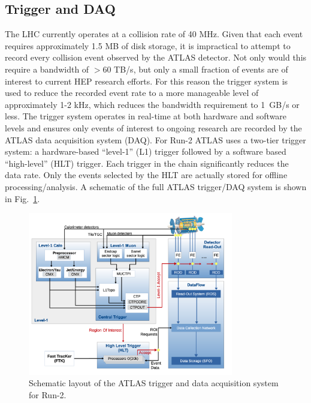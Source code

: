 \subsection{Trigger and DAQ}
The LHC currently operates at a collision rate of 40 MHz.
Given that each event requires approximately 1.5 MB of disk storage, it is impractical to attempt to record every collision event observed by the ATLAS detector.
Not only would this require a bandwidth of $> 60$ TB/s, but only a small fraction of events are of interest to current HEP research efforts.
For this reason the trigger system \cite{Ruiz-Martinez:2133909} is used to reduce the recorded event rate to a more manageable level of approximately 1-2 kHz, which reduces the bandwidth requirement to 1~GB/s or less.
The trigger system operates in real-time at both hardware and software levels and ensures only events of interest to ongoing research are recorded by the ATLAS data acquisition system (DAQ).
For Run-2 ATLAS uses a two-tier trigger system: a hardware-based ``level-1'' (L1) trigger followed by a software based ``high-level'' (HLT) trigger.
Each trigger in the chain significantly reduces the data rate.
Only the events selected by the HLT are actually stored for offline processing/analysis.
A schematic of the full ATLAS trigger/DAQ system is shown in Fig.~\ref{fig:trigger_system}.

\begin{figure}
	\centering
	\includegraphics[width=0.8\textwidth]{atlas_trigger_system}
	\caption{Schematic layout of the ATLAS trigger and data acquisition system for Run-2. \cite{Ruiz-Martinez:2133909}}
	\label{fig:trigger_system}
\end{figure}

